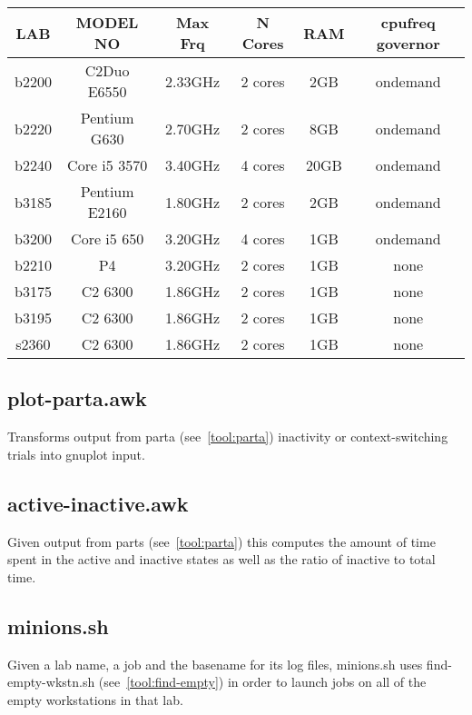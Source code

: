 \documentclass{article}
\begin{document}
\begin{center}
    \begin{tabular}{ | c | c | c | c | c | c |}
    \hline
    LAB   & MODEL NO      & Max Frq & N Cores & RAM  & cpufreq governor \\
    \hline 
    b2200 & C2Duo E6550   & 2.33GHz & 2 cores &  2GB & ondemand \\
    b2220 & Pentium G630  & 2.70GHz & 2 cores &  8GB & ondemand \\
    b2240 & Core i5 3570  & 3.40GHz & 4 cores & 20GB & ondemand \\
    b3185 & Pentium E2160 & 1.80GHz & 2 cores &  2GB & ondemand \\
    b3200 & Core i5 650   & 3.20GHz & 4 cores &  1GB & ondemand \\
    \hline
    b2210 & P4            & 3.20GHz & 2 cores &  1GB & none \\
    b3175 & C2 6300       & 1.86GHz & 2 cores &  1GB & none \\
    b3195 & C2 6300       & 1.86GHz & 2 cores &  1GB & none \\
    s2360 & C2 6300       & 1.86GHz & 2 cores &  1GB & none \\
    \hline
\end{tabular}
\end{center}

\subsection{plot-parta.awk}
Transforms output from parta (see~\ref{tool:parta}) inactivity or 
context-switching trials into gnuplot input.

\subsection{active-inactive.awk} \label{tool:active-inactive}
Given output	 from parts (see~\ref{tool:parta}) this computes the amount of time
spent in the active and inactive states as well as the ratio of inactive to
total time.

\subsection{minions.sh} \label{tool:minions}
Given a lab name, a job and the basename for its log files, minions.sh
uses find-empty-wkstn.sh (see~\ref{tool:find-empty}) in order to launch jobs on
all of the empty workstations in that lab.
\end{document}
